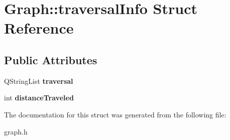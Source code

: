 \hypertarget{struct_graph_1_1traversal_info}{}\section{Graph\+:\+:traversal\+Info Struct Reference}
\label{struct_graph_1_1traversal_info}
\subsection*{Public Attributes}
\begin{DoxyCompactItemize}
\item 
\mbox{\label{struct_graph_1_1traversal_info_a6cc0cefaf64ee80392f52df1e3b98718}} 
Q\+String\+List {\bfseries traversal}
\item 
\mbox{\label{struct_graph_1_1traversal_info_aad37277396b6c83b5e1ea23d5052e098}} 
int {\bfseries distance\+Traveled}
\end{DoxyCompactItemize}


The documentation for this struct was generated from the following file\+:\begin{DoxyCompactItemize}
\item 
graph.\+h\end{DoxyCompactItemize}
